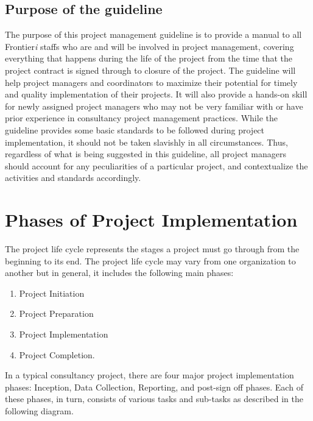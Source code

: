 \documentclass[
]{book}
\theoremstyle{definition}
\theoremstyle{definition}
\theoremstyle{definition}
\theoremstyle{definition}
\theoremstyle{remark}
\begin{document}
\hypertarget{purpose-of-the-guideline}{%
\section{Purpose of the guideline}\label{purpose-of-the-guideline}}

The purpose of this project management guideline is to provide a manual to all Frontier\emph{i} staffs who are and will be involved in project management, covering everything that happens during the life of the project from the time that the project contract is signed through to closure of the project. The guideline will help project managers and coordinators to maximize their potential for timely and quality implementation of their projects. It will also provide a hands-on skill for newly assigned project managers who may not be very familiar with or have prior experience in consultancy project management practices. While the guideline provides some basic standards to be followed during project implementation, it should not be taken slavishly in all circumstances. Thus, regardless of what is being suggested in this guideline, all project managers should account for any peculiarities of a particular project, and contextualize the activities and standards accordingly.

\hypertarget{phases-of-project-implementation}{%
\chapter{Phases of Project Implementation}\label{phases-of-project-implementation}}

The project life cycle represents the stages a project must go through from the beginning to its end. The project life cycle may vary from one organization to another but in general, it includes the following main phases:

\begin{enumerate}
\def\labelenumi{\arabic{enumi}.}
\item
  Project Initiation
\item
  Project Preparation
\item
  Project Implementation
\item
  Project Completion.
\end{enumerate}

In a typical consultancy project, there are four major project implementation phases: Inception, Data Collection, Reporting, and post-sign off phases. Each of these phases, in turn, consists of various tasks and sub-tasks as described in the following diagram.
\end{document}
